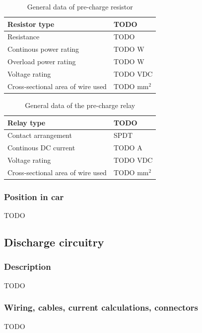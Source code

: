 \documentclass{article}
\begin{document}
	\begin{table}[H]
	    \centering
	    \begin{tabular}{|l|l|}
	    \hline
	    Resistor type & TODO \\ \hline
	    Resistance & TODO \ohm \\ \hline
	    Continous power rating & TODO W \\ \hline
	    Overload power rating & TODO W \\ \hline
	    Voltage rating & TODO VDC \\ \hline
	    Cross-sectional area of wire used & TODO mm$^2$\\ \hline
	    \end{tabular}
	    \caption{General data of pre-charge resistor}
	    \label{prechargeresistor}
	\end{table}

	\begin{table}[H]
	    \centering
	    \begin{tabular}{|l|l|}
	    \hline
	    Relay type & TODO \\ \hline
	    Contact arrangement & SPDT \\ \hline
	    Continous DC current & TODO A \\ \hline
	    Voltage rating & TODO VDC \\ \hline
	    Cross-sectional area of wire used & TODO mm$^2$ \\ \hline
	    \end{tabular}
	    \caption{General data of the pre-charge relay}
	    \label{PCrelay}
	\end{table}

\subsubsection{Position in car}
TODO

\subsection{Discharge circuitry}\label{discharge_circuitry}
\subsubsection{Description}
TODO

\subsubsection{Wiring, cables, current calculations, connectors}
TODO
\end{document}
